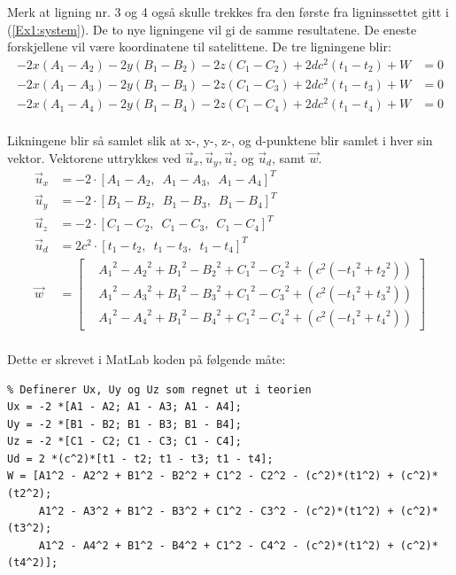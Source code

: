 Merk at ligning nr. 3 og 4 også skulle trekkes fra den første fra ligninssettet gitt i (\ref{Ex1:system}). De to nye ligningene vil gi de samme resultatene. De eneste forskjellene vil være koordinatene til satelittene. De tre ligningene blir:
\begin{align}
- 2x({A_1} - {A_2}) - 2y({B_1} - {B_2}) - 2z({C_1} - {C_2}) + 2d{c^2}({t_1} - {t_2}) + W &= 0 \nonumber \\
- 2x({A_1} - {A_3}) - 2y({B_1} - {B_3}) - 2z({C_1} - {C_3}) + 2d{c^2}({t_1} - {t_3}) + W &= 0  \nonumber\\
- 2x({A_1} - {A_4}) - 2y({B_1} - {B_4}) - 2z({C_1} - {C_4}) + 2d{c^2}({t_1} - {t_4}) + W &= 0 \nonumber \\ \label{Ex1:3equations}
\end{align}

Likningene blir så samlet slik at x-, y-, z-, og d-punktene blir samlet i hver sin vektor. Vektorene uttrykkes ved ${\vec u_x}, {\vec u_y}, {\vec u_z}$ og  ${\vec u_d}$, samt $\vec{w}$. 
\begin{align}
	{\vec u_x} &=  - 2\cdot[{A_1} - {A_2}, \enspace {A_1} - {A_3},  \enspace{A_1} - {A_4}]^T \nonumber \\
	{\vec u_y} &=  - 2\cdot[{B_1} - {B_2},  \enspace{B_1} - {B_3},  \enspace{B_1} - {B_4}]^T \nonumber \\
	{\vec u_z} &=  - 2\cdot[{C_1} - {C_2},  \enspace{C_1} - {C_3},  \enspace{C_1} - {C_4}]^T \nonumber \\
	{\vec u_d} &=  2c^2\cdot[{t_1} - {t_2},  \enspace{t_1} - {t_3},  \enspace{t_1} - {t_4}]^T \nonumber \\
	{\vec w}  &= 
	\begin{bmatrix}
		&{A_1}^2 - {A_2}^2 + {B_1}^2 - {B_2}^2 + {C_1}^2 - {C_2}^2 + ({c^2}( - {t_1}^2 + {t_2}^2)) \\
		&{A_1}^2 - {A_3}^2 + {B_1}^2 - {B_3}^2 + {C_1}^2 - {C_3}^2 + ({c^2}( - {t_1}^2 + {t_3}^2)) \\ 
		&{A_1}^2 - {A_4}^2 + {B_1}^2 - {B_4}^2 + {C_1}^2 - {C_4}^2 + ({c^2}( - {t_1}^2 + {t_4}^2))
	\end{bmatrix}\nonumber \\ \nonumber
\end{align}

Dette er skrevet i MatLab koden på følgende måte: 

\begin{lstlisting}
% Definerer Ux, Uy og Uz som regnet ut i teorien 
Ux = -2 *[A1 - A2; A1 - A3; A1 - A4];
Uy = -2 *[B1 - B2; B1 - B3; B1 - B4];
Uz = -2 *[C1 - C2; C1 - C3; C1 - C4];
Ud = 2 *(c^2)*[t1 - t2; t1 - t3; t1 - t4];
W = [A1^2 - A2^2 + B1^2 - B2^2 + C1^2 - C2^2 - (c^2)*(t1^2) + (c^2)*(t2^2); 
     A1^2 - A3^2 + B1^2 - B3^2 + C1^2 - C3^2 - (c^2)*(t1^2) + (c^2)*(t3^2); 
     A1^2 - A4^2 + B1^2 - B4^2 + C1^2 - C4^2 - (c^2)*(t1^2) + (c^2)*(t4^2)]; 
\end{lstlisting}

